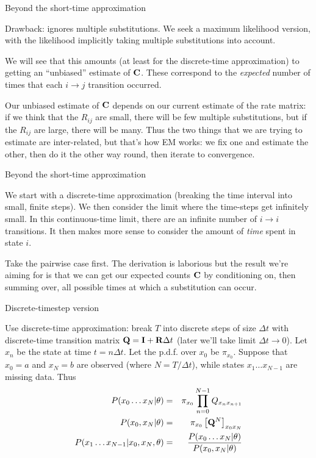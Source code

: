 \documentclass{beamer}
\begin{document}
\begin{frame}{Beyond the short-time approximation}
 \itemb
 \item Drawback: ignores multiple substitutions. We seek a maximum likelihood version,
with the likelihood implicitly taking multiple substitutions into account.
 \item We will see that this amounts (at least for the discrete-time approximation)
to getting an ``unbiased'' estimate of ${\bf C}$.
These correspond to the {\em expected} number of times that each $i \to j$ transition occurred.
 \item Our unbiased estimate of ${\bf C}$ depends on our current estimate of the rate matrix:
if we think that the $R_{ij}$ are small, there will be few multiple substitutions,
but if the $R_{ij}$ are large, there will be many.
Thus the two things that we are trying to estimate are inter-related, but that's how EM works:
we fix one and estimate the other, then do it the other way round, then iterate to convergence.
 \iteme
\end{frame}

\begin{frame}{Beyond the short-time approximation}
 \itemb
 \item We start with a discrete-time approximation (breaking the time interval into small, finite steps).
We then consider the limit where the time-steps get infinitely small.
In this continuous-time limit, there are an infinite number of $i \to i$ transitions.
It then makes more sense to consider the amount of {\em time} spent in state $i$.
\item Take the pairwise case first.
The derivation is laborious but the result we're aiming for is that we can get our expected counts ${\bf C}$
by conditioning on, then summing over, all possible times at which a substitution can occur.
 \iteme
\end{frame}

\begin{frame}{Discrete-timestep version}
 \itemb
 \item Use discrete-time approximation: break $T$ into discrete steps of size $\Delta t$
with discrete-time transition matrix ${\bf Q} = {\bf I} + {\bf R} \Delta t$
(later we'll take limit $\Delta t \to 0$).
Let $x_n$ be the state at time $t = n \Delta t$.
Let the p.d.f. over $x_0$ be $\pi_{x_0}$.
Suppose that $x_0=a$ and $x_N=b$ are observed (where $N = T / \Delta t$),
while states $x_1 \ldots x_{N-1}$ are missing data.
Thus
\begin{eqnarray*}
P(x_0 \ldots x_N | \theta) & = & \pi_{x_0} \prod_{n=0}^{N-1} Q_{x_n x_{n+1}} \\
P(x_0, x_N | \theta) & = & \pi_{x_0} \left[ {\bf Q}^N \right]_{x_0 x_N} \\
\displaystyle
P(x_1 \ldots x_{N-1} | x_0, x_N, \theta) & = & \frac{P(x_0 \ldots x_N | \theta)}{P(x_0, x_N | \theta)}
\end{eqnarray*}
 \iteme
\end{frame}
\end{document}
